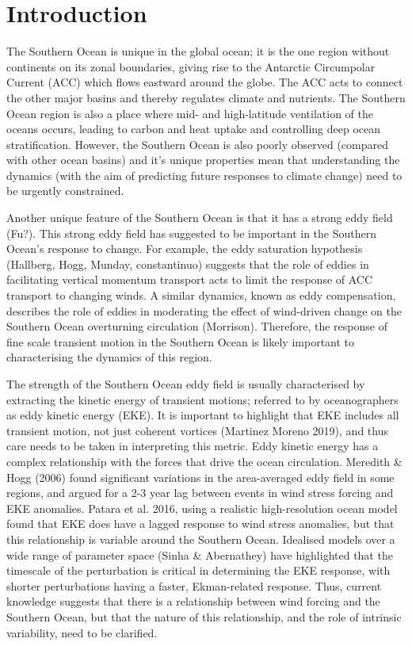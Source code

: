 \documentclass{agujournal2019}
\begin{document}
%
%

\section{Introduction}

The Southern Ocean is unique in the global ocean; it is the one region without continents on its zonal boundaries, giving rise to the Antarctic Circumpolar Current (ACC) which flows eastward around the globe.
The ACC acts to connect the other major basins and thereby regulates climate and nutrients.
The Southern Ocean region is also a place where mid- and high-latitude ventilation of the oceans occurs, leading to carbon and heat uptake and controlling deep ocean stratification.
However, the Southern Ocean is also poorly observed (compared with other ocean basins) and it's unique properties mean that understanding the dynamics (with the aim of predicting future responses to climate change) need to be urgently constrained.

Another unique feature of the Southern Ocean is that it has a strong eddy field (Fu?).
This strong eddy field has suggested to be important in the Southern Ocean's response to change.
For example, the eddy saturation hypothesis (Hallberg, Hogg, Munday, constantinuo) suggests that the role of eddies in facilitating vertical momentum transport acts to limit the response of ACC transport to changing winds.
A similar dynamics, known as eddy compensation, describes the role of eddies in moderating the effect of wind-driven change on the Southern Ocean overturning circulation (Morrison).
Therefore, the response of fine scale transient motion in the Southern Ocean is likely important to characterising the dynamics of this region.

The strength of the Southern Ocean eddy field is usually characterised by extracting the kinetic energy of transient motions; referred to by oceanographers as eddy kinetic energy (EKE). 
It is important to highlight that EKE includes all transient motion, not just coherent vortices (Martinez Moreno 2019), and thus care needs to be taken in interpreting this metric.
Eddy kinetic energy has a complex relationship with the forces that drive the ocean circulation.
Meredith \& Hogg (2006) found significant variations in the area-averaged eddy field in some regions, and argued for a 2-3 year lag between events in wind stress forcing and EKE anomalies.
Patara et al. 2016, using a realistic high-resolution ocean model found that EKE does have a lagged response to wind stress anomalies, but that this relationship is variable around the Southern Ocean.
Idealised models over a wide range of parameter space (Sinha \& Abernathey) have highlighted that the timescale of the perturbation is critical in determining the EKE response, with shorter perturbations having a faster, Ekman-related response.
Thus, current knowledge suggests that there is a relationship between wind forcing and the Southern Ocean, but that the nature of this relationship, and the role of intrinsic variability, need to be clarified.
\end{document}
